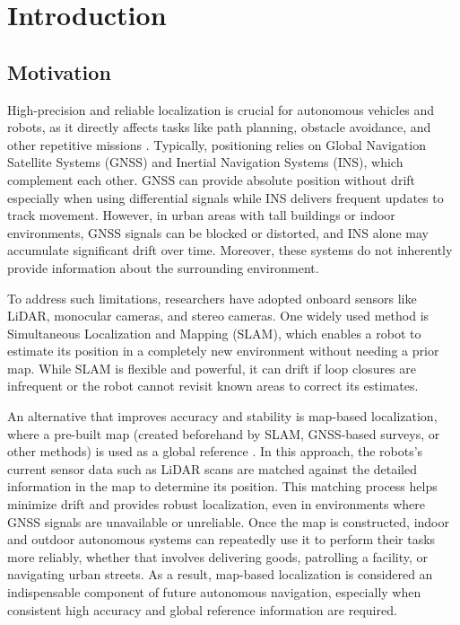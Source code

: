 \chapter{Introduction}
\label{ch:intro}

\section{Motivation}
High-precision and reliable localization is crucial for autonomous vehicles and robots, as it directly affects tasks like path planning, obstacle avoidance, and other repetitive missions \cite{kim2018stereo}. Typically, positioning relies on Global Navigation Satellite Systems (GNSS) and Inertial Navigation Systems (INS), which complement each other. GNSS can provide absolute position without drift especially when using differential signals while INS delivers frequent updates to track movement\cite{carvalho1997optimal}. However, in urban areas with tall buildings or indoor environments, GNSS signals can be blocked or distorted, and INS alone may accumulate significant drift over time\cite{liu2019segmentation}. Moreover, these systems do not inherently provide information about the surrounding environment.

To address such limitations, researchers have adopted onboard sensors like LiDAR, monocular cameras, and stereo cameras. One widely used method is Simultaneous Localization and Mapping (SLAM), which enables a robot to estimate its position in a completely new environment without needing a prior map. While SLAM is flexible and powerful, it can drift if loop closures are infrequent or the robot cannot revisit known areas to correct its estimates.

An alternative that improves accuracy and stability is map-based localization, where a pre-built map (created beforehand by SLAM, GNSS-based surveys, or other methods) is used as a global reference \cite{levinson2007mapbased}. In this approach, the robots’s current sensor data such as LiDAR scans are matched against the detailed information in the map to determine its position. This matching process helps minimize drift and provides robust localization, even in environments where GNSS signals are unavailable or unreliable. Once the map is constructed, indoor and outdoor autonomous systems can repeatedly use it to perform their tasks more reliably, whether that involves delivering goods, patrolling a facility, or navigating urban streets. As a result, map-based localization is considered an indispensable component of future autonomous navigation, especially when consistent high accuracy and global reference information are required.



